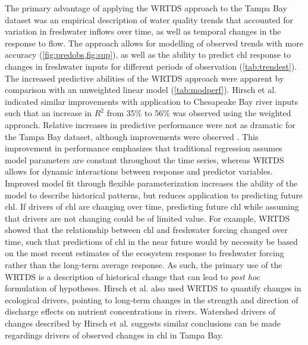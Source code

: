 \documentclass{svjour3}\usepackage[]{graphicx}\usepackage[]{color}
\begin{document}
The primary advantage of applying the \ac{WRTDS} approach to the Tampa Bay dataset was an empirical description of water quality trends that accounted for variation in freshwater inflows over time, as well as temporal changes in the response to flow. The approach allows for modelling of observed trends with more accuracy (\cref{fig:predobs,fig:sup}), as well as the ability to predict \ac{chl} response to changes in freshwater inputs for different periods of observation (\cref{tab:trendest}). The increased predictive abilities of the \ac{WRTDS} approach were apparent by comparison with an unweighted linear model (\cref{tab:modperf}).  Hirsch et al. \cite{Hirsch10} indicated similar improvements with application to Chesapeake Bay river inputs such that an increase in $R^2$ from 35\% to 56\% was observed using the weighted approach.  Relative increases in predictive performance were not as dramatic for the Tampa Bay dataset, although improvements were observed \cite{Hirsch10}.  This improvement in performance emphasizes that traditional regression assumes model parameters are constant throughout the time series, whereas \ac{WRTDS} allows for dynamic interactions between response and predictor variables.  Improved model fit through flexible parameterization increases the ability of the model to describe historical patterns, but reduces application to predicting future \ac{chl}.  If drivers of \ac{chl} are changing over time, predicting future \ac{chl} while assuming that drivers are not changing could be of limited value.  For example, \ac{WRTDS} showed that the relationship between \ac{chl} and freshwater forcing changed over time, such that predictions of \ac{chl} in the near future would by necessity be based on the most recent estimates of the ecosystem response to freshwater forcing rather than the long-term average response.  As such, the primary use of the \ac{WRTDS} is a description of historical change that can lead to \textit{post hoc} formulation of hypotheses.  Hirsch et al. \cite{Hirsch10} also used WRTDS to quantify changes in ecological drivers, pointing to long-term changes in the strength and direction of discharge effects on nutrient concentrations in rivers.  Watershed drivers of changes described by Hirsch et al. \cite{Hirsch10} suggests similar conclusions can be made regardings drivers of observed changes in \ac{chl} in Tampa Bay.  
\end{document}
